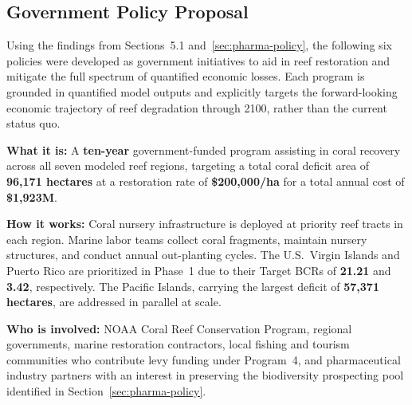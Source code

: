 \documentclass[10pt,letterpaper]{article}
\newcounter{gs}
\begin{document}
\subsection{Government Policy Proposal}

Using the findings from Sections~5.1 and~\ref{sec:pharma-policy}, the following six policies were developed as government initiatives to aid in reef restoration and mitigate the full spectrum of quantified economic losses. Each program is grounded in quantified model outputs and explicitly targets the forward-looking economic trajectory of reef degradation through 2100, rather than the current status quo.

\begin{tcolorbox}[title=Program 1: Coral Reef Restoration --- \$1{,}923M Annual Total,
  colback=blue!5, colframe=blue!50!black, fonttitle=\bfseries, breakable]

  \textbf{What it is:} A \textbf{ten-year} government-funded program assisting in coral recovery across all seven modeled reef regions, targeting a total coral deficit area of \textbf{96,171 hectares} at a restoration rate of \textbf{\$200,000/ha} for a total annual cost of \textbf{\$1,923M}.

  \medskip
  \textbf{How it works:} Coral nursery infrastructure is deployed at priority reef tracts in each region. Marine labor teams collect coral fragments, maintain nursery structures, and conduct annual out-planting cycles. The U.S.\ Virgin Islands and Puerto Rico are prioritized in Phase~1 due to their Target BCRs of \textbf{21.21} and \textbf{3.42}, respectively. The Pacific Islands, carrying the largest deficit of \textbf{57,371 hectares}, are addressed in parallel at scale.

  \medskip
  \textbf{Who is involved:} NOAA Coral Reef Conservation Program, regional governments, marine restoration contractors, local fishing and tourism communities who contribute levy funding under Program~4, and pharmaceutical industry partners with an interest in preserving the biodiversity prospecting pool identified in Section~\ref{sec:pharma-policy}.


\end{tcolorbox}
\end{document}
